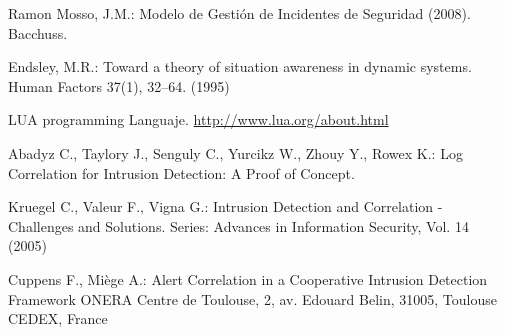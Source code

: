 \documentclass[a4paper]{./plantillas/llncs}
\begin{document}
\begin{thebibliography}{4}

 Ramon Mosso, J.M.: Modelo de Gestión de Incidentes de Seguridad (2008). Bacchuss.

 Endsley, M.R.: Toward a theory of situation awareness in dynamic systems. Human Factors 37(1), 32–64. (1995)

 LUA programming Languaje. \url{http://www.lua.org/about.html}

 Abadyz C., Taylory J., Senguly C., Yurcikz W., Zhouy Y., Rowex K.: Log Correlation for Intrusion Detection: A Proof of Concept.

 Kruegel C., Valeur F., Vigna G.: Intrusion Detection and Correlation - Challenges and Solutions.
Series: Advances in Information Security, Vol. 14 (2005)

 Cuppens F., Miège A.: Alert Correlation in a Cooperative Intrusion Detection Framework
ONERA Centre de Toulouse, 2, av. Edouard Belin, 31005, Toulouse CEDEX, France

\end{thebibliography}
\end{document}
